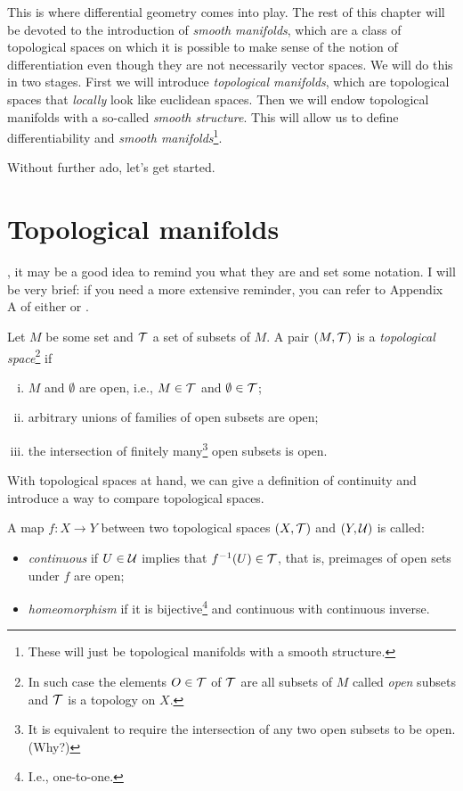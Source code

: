 This is where differential geometry comes into play.
The rest of this chapter will be devoted to the introduction of \emph{smooth manifolds}, which are a class of topological spaces on which it is possible to make sense of the notion of differentiation even though they are not necessarily vector spaces.
We will do this in two stages.
First we will introduce \emph{topological manifolds}, which are topological spaces that \emph{locally} look like euclidean spaces.
Then we will endow topological manifolds with a so-called \emph{smooth structure}.
This will allow us to define differentiability and \emph{smooth manifolds}\footnote{These will just be topological manifolds with a smooth structure.}.

Without further ado, let's get started.

\section{Topological manifolds}

, it may be a good idea to remind you what they are and set some notation.
I will be very brief: if you need a more extensive reminder, you can refer to Appendix A of either \cite{book:tu} or \cite{book:lee}.

\begin{defn}
  Let $M$ be some set and $\mathcal{T}$ a set of subsets of $M$.
  A pair $(M, \mathcal{T})$ is a \emph{topological space}\footnote{In such case the elements $O\in\mathcal{T}$ of $\mathcal{T}$ are all subsets of $M$ called \emph{open} subsets and $\mathcal{T}$ is a topology on $X$.} if
  \begin{enumerate}[(i)]
    \item $M$ and $\emptyset$ are open, i.e., $M\in \mathcal{T}$ and $\emptyset\in\mathcal{T}$;
    \item arbitrary unions of families of open subsets are open;
    \item the intersection of finitely many\footnote{It is equivalent to require the intersection of any two open subsets to be open. (Why?)} open subsets is open.
  \end{enumerate}
\end{defn}

With topological spaces at hand, we can give a definition of continuity and introduce a way to compare topological spaces.

\begin{defn}
  A map $f: X \to Y$ between two topological spaces $(X,\mathcal{T})$ and $(Y, \mathcal{U})$ is called:
  \begin{itemize}
    \item \emph{continuous} if $U\in\mathcal{U}$ implies that $f^{-1}(U)\in\mathcal{T}$, that is, preimages of open sets under $f$ are open;
    \item \emph{homeomorphism} if it is bijective\footnote{I.e., one-to-one.} and continuous with continuous inverse.
  \end{itemize}
\end{defn}

